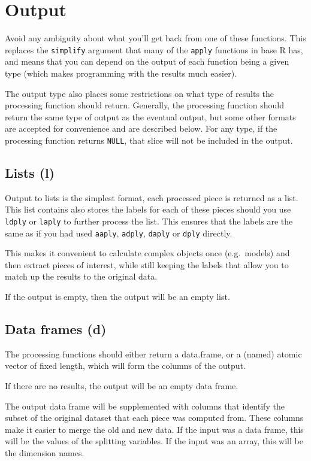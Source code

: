 \documentclass[letterpaper,oneside]{scrartcl}
\begin{document}
\section{Output}
\label{sec:output}

Avoid any ambiguity about what you'll get back from one of these functions. This replaces the {\tt simplify} argument that many of the {\tt apply} functions in base R has, and means that you can depend on the output of each function being a given type (which makes programming with the results much easier).

The output type also places some restrictions on what type of results the processing function should return.  Generally, the processing function should return the same type of output as the eventual output, but some other formats are accepted for convenience and are described below.  For any type, if the processing function returns {\tt NULL}, that slice will not be included in the output.

\subsection{Lists (l)}

Output to lists is the simplest format, each processed piece is returned as a list.  This list contains also stores the labels for each of these pieces should you use {\tt ldply} or {\tt laply} to further process the list.  This ensures that the labels are the same as if you had used {\tt aaply}, {\tt adply}, {\tt daply} or {\tt dply} directly.

This makes it convenient to calculate complex objects once (e.g.\ models) and then extract pieces of interest, while still keeping the labels that allow you to match up the results to the original data.

If the output is empty, then the output will be an empty list.

\subsection{Data frames (d)}

The processing functions should either return a data.frame, or a (named) atomic vector of fixed length, which will form the columns of the output.

If there are no results, the output will be an empty data frame.

The output data frame will be supplemented with columns that identify the subset of the original dataset that each piece was computed from.  These columns make it easier to merge the old and new data.  If the input was a data frame, this will be the values of the splitting variables.  If the input was an array, this will be the dimension names.
\end{document}
